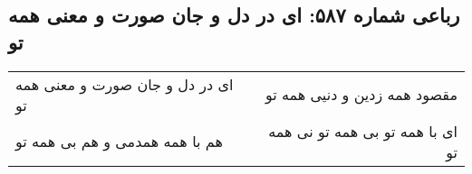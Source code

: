 \begin{center}
\section*{رباعی شماره ۵۸۷: ای در دل و جان صورت و معنی همه تو}
\label{sec:sh587}
\begin{longtable}{l p{0.5cm} r}
ای در دل و جان صورت و معنی همه تو
&&
مقصود همه زدین و دنیی همه تو
\\
هم با همه همدمی و هم بی همه تو
&&
ای با همه تو بی همه تو نی همه تو
\\
\end{longtable}
\end{center}
